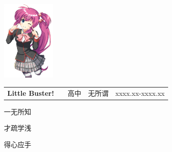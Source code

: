 \documentclass{cv}
\begin{document}
   \addPageColorBars


      \begin{minipage}[t]{0.55\textwidth}
           \\
         \vfill
            \\
         \vfill
              \\
         \vfill
         \\
         \vfill
              \\
         \vfill
         \vfill
   \end{minipage}
   \hfill
   \begin{adjustbox}{valign=t, max height=0.2\textheight}
      \includegraphics[width=0.2\textwidth]{avatar.png} 
   \end{adjustbox}
   \vspace{5pt}


   \vspace{5pt}
   \begin{tabularx}{\textwidth}{XXXXX}
      \textbf{Little Buster!} & {要你管} & 高中 & 无所谓 & xxxx.xx-xxxx.xx\\
   \end{tabularx}
   \vspace{5pt}

\noindent
\begin{description}[topsep=5pt,leftmargin=0pt,itemsep=0.8pt ]
    \item[Music：] 一无所知
    \item[烹饪：] 才疏学浅
    \item[搞事情：]得心应手
\end{description}
\vspace{5pt}
\end{document}
